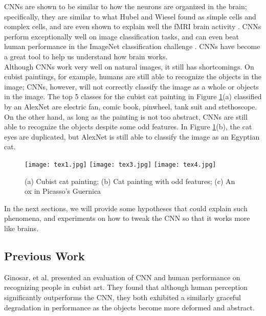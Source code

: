 \documentclass[11pt]{article}
\begin{document}
CNNs are shown to be similar to how the neurons are organized in the brain; specifically, they are similar to what Hubel and Wiesel found as simple cells and complex cells, and are even shown to explain well the fMRI brain activity \cite{key:fMRIstudy}. CNNs perform exceptionally well on image classification tasks, and can even beat human performance in the ImageNet classification challenge \cite{key:DeepResidualNet}. CNNs have become a great tool to help us understand how brain works.\\

Although CNNs work very well on natural images, it still has shortcomings. On cubist paintings, for example, humans are still able to recognize the objects in the image; CNNs, however, will not correctly classify the image as a whole or objects in the image. The top 5 classes for the cubist cat painting in Figure \ref{fig:cubist}(a) classified by an AlexNet are electric fan, comic book, pinwheel, tank suit and stethoscope. On the other hand, as long as the painting is not too abstract, CNNs are still able to recognize the objects despite some odd features. In Figure \ref{fig:cubist}(b), the cat eyes are duplicated, but AlexNet is still able to classify the image as an Egyptian cat.\\

\begin{figure}[h]
    \centering
    \texttt{[image: tex1.jpg]}
    \hspace{25pt}
    \texttt{[image: tex3.jpg]}
    \hspace{25pt}
    \texttt{[image: tex4.jpg]}
    \caption{(a) Cubist cat painting; (b) Cat painting with odd features; (c) An ox in Picasso's Guernica}
    \label{fig:cubist}
\end{figure}

In the next sections, we will provide some hypotheses that could explain such phenomena, and experiments on how to tweak the CNN so that it works more like brains.

\subsection{Previous Work}
Ginosar, et al. \cite{key:DetectingPeopleCubist} presented an evaluation of CNN and human performance on recognizing people in cubist art. They found that although human perception significantly outperforms the CNN, they both exhibited a similarly graceful degradation in performance as the objects become more deformed and abstract.
\end{document}
